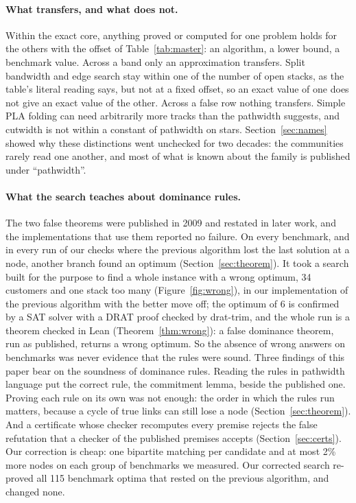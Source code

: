 \paragraph{What transfers, and what does not.} Within the exact core, anything
proved or computed for one problem holds for the others with the offset of
Table~\ref{tab:master}: an algorithm, a lower bound, a benchmark value. Across
a band only an approximation transfers. Split bandwidth and edge search stay
within one of the number of open stacks, as the table's literal reading says,
but not at a fixed offset, so an exact value of one does not give an exact
value of the other. Across a false row nothing transfers. Simple PLA folding
can need arbitrarily more tracks than the pathwidth suggests, and cutwidth is
not within a constant of pathwidth on stars. Section~\ref{sec:names} showed why
these distinctions went unchecked for two decades: the communities rarely read
one another, and most of what is known about the family is published under
``pathwidth''.

\paragraph{What the search teaches about dominance rules.} The two false
theorems were published in 2009 and restated in later work, and the
implementations that use them reported no failure. On every benchmark, and in
every run of our checks where the previous algorithm \citep{ChuStuckey2009} lost the last solution at a
node, another branch found an optimum (Section~\ref{sec:theorem}). It took a
search built for the purpose to find a whole instance with a wrong optimum,
34 customers and one stack too many (Figure~\ref{fig:wrong}), in our
implementation of the previous algorithm with the better move off; the optimum
of 6 is confirmed by a SAT solver with a DRAT proof checked by drat-trim, and the whole run is a theorem checked in Lean
(Theorem~\ref{thm:wrong}): a false dominance theorem, run as published,
returns a wrong optimum. So the absence of
wrong answers on benchmarks was never evidence that the rules were sound. Three findings of this paper bear on the soundness of dominance rules. Reading the rules in pathwidth language put the correct rule, the
commitment lemma, beside the published one. Proving each rule on its own was
not enough: the order in which the rules run matters, because a cycle of true
links can still lose a node (Section~\ref{sec:theorem}). And a certificate
whose checker recomputes every premise rejects the false refutation that a
checker of the published premises accepts (Section~\ref{sec:certs}). Our correction
is cheap: one bipartite matching per candidate and at most 2\% more nodes on each group of benchmarks we measured. Our corrected search re-proved all 115 benchmark optima that
rested on the previous algorithm, and changed none.

